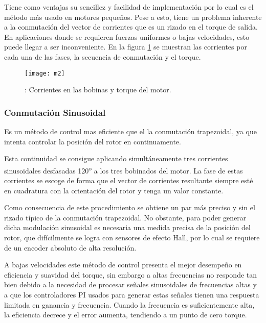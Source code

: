 Tiene como ventajas su sencillez y facilidad de implementación por lo cual es el método más usado en motores pequeños. Pese a esto, tiene un problema inherente a la conmutación del vector de corrientes que es un rizado en el torque de salida. En aplicaciones donde se requieren fuerzas uniformes o bajas velocidades, esto puede llegar a ser inconveniente. En la figura \ref{fig:corrientes_bobinas} se muestran las corrientes por cada una de las fases, la secuencia de conmutación y el torque.

\begin{figure}[h]
  \centering
  \texttt{[image: m2]}
  \caption{: Corrientes en las bobinas y torque del motor.}\label{fig:corrientes_bobinas}
\end{figure}


\subsubsection{Conmutación Sinusoidal}
\label{subsubsection: conmutacion_sin}

Es un método de control mas eficiente que el la conmutación trapezoidal, ya que intenta controlar la posición del rotor en continuamente.

Esta continuidad se consigue aplicando simultáneamente tres corrientes sinusoidales
desfasadas 120\textsuperscript{o} a los tres bobinados del motor. La fase de estas corrientes se escoge de forma que el vector de corrientes resultante siempre esté en cuadratura con la orientación del rotor y tenga un valor constante.

Como consecuencia de este procedimiento se obtiene un par más preciso y sin el rizado típico de la conmutación trapezoidal. No obstante, para poder generar dicha modulación sinusoidal es necesaria una medida precisa de la posición del rotor, que difícilmente se logra con sensores de efecto Hall, por lo cual se requiere de un encoder absoluto de alta resolución.

A bajas velocidades este método de control presenta el mejor desempeño en eficiencia y suavidad del torque, sin embargo a altas frecuencias no responde tan bien debido a la necesidad de procesar señales sinusoidales de frecuencias altas y a que los controladores PI usados para generar estas señales tienen una respuesta limitada en ganancia y frecuencia. Cuando la frecuencia es suficientemente alta, la eficiencia decrece y el error aumenta, tendiendo a un punto de cero torque.

